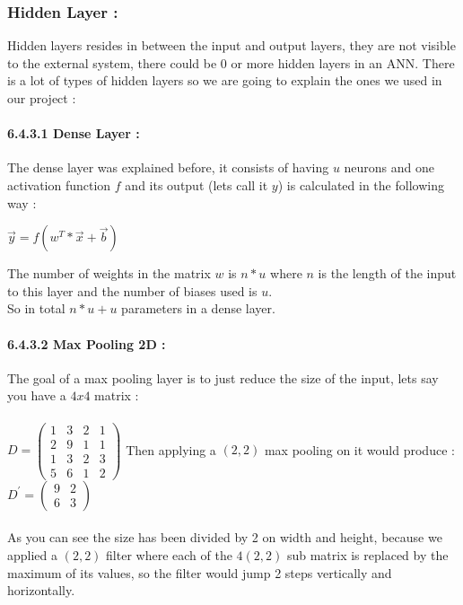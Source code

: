 \documentclass[10pt,a4paper]{article}
\begin{document}
\subsubsection{Hidden Layer :}
Hidden layers resides in between the input and output layers, they are not visible to the external system, there could be 0 or more hidden layers in an ANN. There is a lot of types of hidden layers so we are going to explain the ones we used in our project :
\paragraph{6.4.3.1 Dense Layer :}
The dense layer was explained before, it consists of having $ u $ neurons and one activation function $ f $ and its output (lets call it $ y $) is calculated in the following way :\\
\begin{center}
$ \vec{y} = f(w^{T}*\vec{x} + \vec{b}) $
\end{center}
The number of weights in the matrix $ w $ is $ n*u $ where $ n $ is the length of the input to this layer and the number of biases used is $ u $.\\
So in total $ n*u + u $ parameters in a dense layer.
\paragraph{6.4.3.2 Max Pooling 2D :}
The goal of a max pooling layer is to just reduce the size of the input, lets say you have a $ 4x4 $ matrix :\\\\
$D = 
\begin{pmatrix}
1 & 3 & 2 & 1\\
2 & 9 & 1 & 1\\
1 & 3 & 2 & 3\\
5 & 6 & 1 & 2
\end{pmatrix}
$
Then applying a $ (2,2) $ max pooling on it would produce :
$D^{\prime} = 
\begin{pmatrix}
9 & 2\\
6 & 3
\end{pmatrix}
$\\\\
As you can see the size has been divided by 2 on width and height, because we applied a $ (2,2) $ filter where each of the $ 4 (2,2) $ sub matrix is replaced by the maximum of its values, so the filter would jump 2 steps vertically and horizontally.
\end{document}
